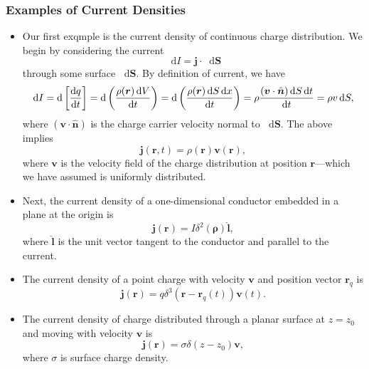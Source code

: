 \documentclass[11pt, a4paper]{article}
\newcommand{\diff}{\mathop{}\!\mathrm{d}} %
\renewcommand{\vec}[1]{\bm{#1}} %
\newcommand{\uvec}[1]{\hat{\vec{#1}}} %
\renewcommand{\r}{\vec{r}}
\renewcommand{\j}{\vec{j}}  %
\begin{document}
\subsubsection{Examples of Current Densities}
\begin{itemize}
	\item Our first exqmple is the current density of continuous charge distribution. We begin by considering the current
	\begin{equation*}
		\diff I = \vec{j}\cdot \diff \vec{S}
	\end{equation*}
	through some surface $ \diff \vec{S} $. By definition of current, we have
	\begin{equation*}
		\diff I = \diff \left[\dv{q}{t}\right] = \diff \left(\frac{\rho(\r)\diff V}{\diff t}\right) = \diff \left(\frac{\rho(\r)\diff S \diff x}{\diff t}\right)  = \rho \frac{(\vec{v} \cdot \uvec{n}) \diff S \diff t}{\diff t} = \rho v \diff S,
	\end{equation*}
	where $ (\vec{v} \cdot \uvec{n}) $ is the charge carrier velocity normal to $ \diff \vec{S} $. The above implies
	\begin{equation*}
		\vec{j}(\r, t) = \rho(\r) \vec{v}(\r),
	\end{equation*}
	where $ \vec{v} $ is the velocity field of the charge distribution at position $ \r $---which we have assumed is uniformly distributed.
	
	\item Next, the current density of a one-dimensional conductor embedded in a plane at the origin is
	\begin{equation*}
		\j(\r) = I \delta^{2}(\vec{\rho}) \uvec{l},
	\end{equation*}
	where $ \uvec{l} $ is the unit vector tangent to the conductor and parallel to the current.
	
	\item The current density of a point charge with velocity $ \vec{v} $ and position vector $ \r_{q} $ is
	\begin{equation*}
		\j(\r) = q \delta^{3}(\r - \r_{q}(t))\vec{v}(t).
	\end{equation*}
	
    \item The current density of charge distributed through a planar surface at $ z = z_{0} $ and moving with velocity $ \vec{v} $ is
	\begin{equation*}
		\j(\r) = \sigma \delta (z - z_{0})\vec{v},
	\end{equation*}
	where $ \sigma $ is surface charge density. 
	
\end{itemize}
\end{document}
